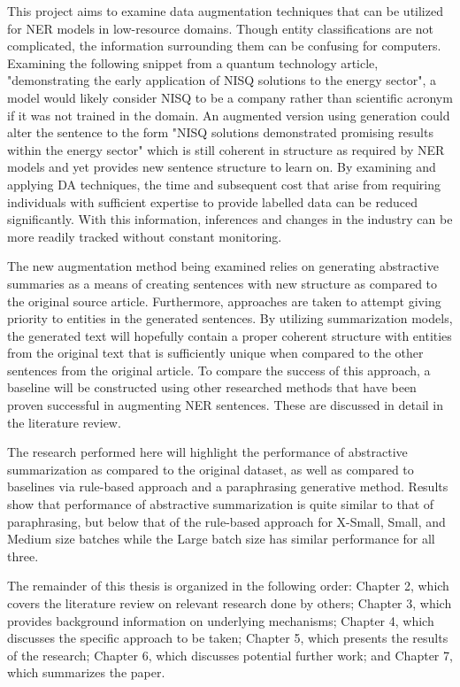 \documentclass[12pt]{report}
\begin{document}
    This project aims to examine data augmentation techniques that can be utilized for NER models in low-resource domains. Though entity classifications are not complicated, the information surrounding them can be confusing for computers. Examining the following snippet from a quantum technology article, "demonstrating the early application of NISQ solutions to the energy sector", a model would likely consider NISQ to be a company rather than scientific acronym if it was not trained in the domain. An augmented version using generation could alter the sentence to the form "NISQ solutions demonstrated promising results within the energy sector" which is still coherent in structure as required by NER models and yet provides new sentence structure to learn on. By examining and applying DA techniques, the time and subsequent cost that arise from requiring individuals with sufficient expertise to provide labelled data can be reduced significantly. With this information, inferences and changes in the industry can be more readily tracked without constant monitoring.

    The new augmentation method being examined relies on generating abstractive summaries as a means of creating sentences with new structure as compared to the original source article. Furthermore, approaches are taken to attempt giving priority to entities in the generated sentences. By utilizing summarization models, the generated text will hopefully contain a proper coherent structure with entities from the original text that is sufficiently unique when compared to the other sentences from the original article. To compare the success of this approach, a baseline will be constructed using other researched methods that have been proven successful in augmenting NER sentences. These are discussed in detail in the literature review.
    
    The research performed here will highlight the performance of abstractive summarization as compared to the original dataset, as well as compared to baselines via rule-based approach and a paraphrasing generative method. Results show that performance of abstractive summarization is quite similar to that of paraphrasing, but below that of the rule-based approach for X-Small, Small, and Medium size batches while the Large batch size has similar performance for all three.
    
    The remainder of this thesis is organized in the following order: Chapter 2, which covers the literature review on relevant research done by others; Chapter 3, which provides background information on underlying mechanisms; Chapter 4, which discusses the specific approach to be taken; Chapter 5, which presents the results of the research; Chapter 6, which discusses potential further work; and Chapter 7, which summarizes the paper.
\end{document}
